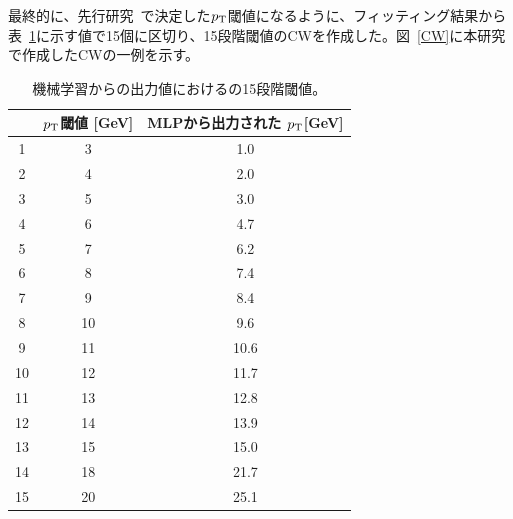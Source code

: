 最終的に、先行研究~\cite{article:shiomi-mron}で決定した$p_{\rm{T}}$閾値になるように、フィッティング結果から表~\ref{Effective_number}に示す値で15個に区切り、15段階閾値のCWを作成した。図~\ref{CW}に本研究で作成したCWの一例を示す。

\begin{table}[thb]
\centering
    \caption{機械学習からの出力値におけるの15段階閾値。}
    \label{Effective_number}
    \begin{tabular}{|c|c|c|}
        \hline
         & $p_{\rm{T}}$閾値 [GeV]&MLPから出力された $p_{\rm{T}}$[GeV]\\
        \hline
        1 & 3&1.0\\
        \hline
        2 & 4&2.0\\
        \hline
        3 & 5&3.0\\
        \hline
        4 & 6&4.7\\
        \hline
        5 & 7&6.2\\
        \hline
        6 & 8&7.4\\
        \hline
        7 & 9&8.4\\
        \hline
        8 & 10&9.6\\
        \hline
        9 & 11&10.6\\
        \hline
        10 & 12&11.7\\
        \hline
        11 & 13&12.8\\
        \hline
        12 & 14&13.9\\
        \hline
        13 & 15&15.0\\
        \hline
        14 & 18&21.7\\
        \hline
        15 & 20&25.1\\
        \hline
        
    \end{tabular}
\end{table}


